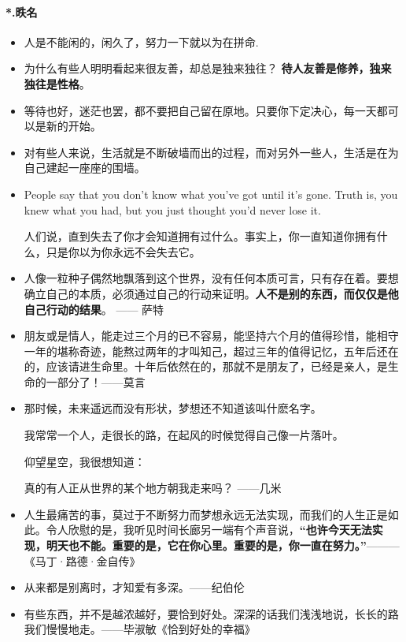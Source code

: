 \documentclass[UTF8,a4paper,8pt]{ctexart}
\begin{document}
 \paragraph{*.昳名}
 \begin{itemize}
 	\item  人是不能闲的，闲久了，努力一下就以为在拼命.
 	\item  为什么有些人明明看起来很友善，却总是独来独往？\textbf{ 待人友善是修养，独来独往是性格}。
 	\item  等待也好，迷茫也罢，都不要把自己留在原地。只要你下定决心，每一天都可以是新的开始。
 	\item  对有些人来说，生活就是不断破墙而出的过程，而对另外一些人，生活是在为自己建起一座座的围墙。
 	\item  People say that you don't know what you've got until it's gone. Truth is, you knew what you had, but you just thought you'd never lose it. 
 	
 	人们说，直到失去了你才会知道拥有过什么。事实上，你一直知道你拥有什么，只是你以为你永远不会失去它。
 	\item  人像一粒种子偶然地飘落到这个世界，没有任何本质可言，只有存在着。要想确立自己的本质，必须通过自己的行动来证明。\textbf{人不是别的东西，而仅仅是他自己行动的结果}。 —— 萨特 
 	
 	\item 朋友或是情人，能走过三个月的已不容易，能坚持六个月的值得珍惜，能相守一年的堪称奇迹，能熬过两年的才叫知己，超过三年的值得记忆，五年后还在的，应该请进生命里。十年后依然在的，那就不是朋友了，已经是亲人，是生命的一部分了！——莫言
 	
 	\item 那时候，未来遥远而没有形状，梦想还不知道该叫什麽名字。
 	
 	我常常一个人，走很长的路，在起风的时候觉得自己像一片落叶。
 	
 	仰望星空，我很想知道：
 	
 	真的有人正从世界的某个地方朝我走来吗？
 	——几米
 	
 	\item 人生最痛苦的事，莫过于不断努力而梦想永远无法实现，而我们的人生正是如此。令人欣慰的是，我听见时间长廊另一端有个声音说，\textbf{“也许今天无法实现，明天也不能。重要的是，它在你心里。重要的是，你一直在努力。”}———《马丁·路德·金自传》
 	
 	\item 从来都是别离时，才知爱有多深。——纪伯伦
 	
 	\item 有些东西，并不是越浓越好，要恰到好处。深深的话我们浅浅地说，长长的路我们慢慢地走。——毕淑敏《恰到好处的幸福》
 	

\end{itemize}
\end{document}
